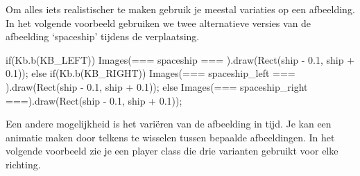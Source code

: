 Om alles iets realistischer te maken gebruik je meestal variaties op een afbeelding. In het volgende voorbeeld gebruiken we twee alternatieve versies van de afbeelding `spaceship' tijdens de verplaatsing.

\begin{code}
if(Kb.b(KB_LEFT))
{
	Images(=== spaceship ===      ).draw(Rect(ship - 0.1,  ship + 0.1));
} else if(Kb.b(KB_RIGHT))
{
	Images(=== spaceship_left === ).draw(Rect(ship - 0.1,  ship + 0.1));
} else
{
	Images(=== spaceship_right ===).draw(Rect(ship - 0.1,  ship + 0.1));
}
\end{code}

Een andere mogelijkheid is het vari\"eren van de afbeelding in tijd. Je kan een animatie maken door telkens te wisselen tussen bepaalde afbeeldingen. In het volgende voorbeeld zie je een player class die drie varianten gebruikt voor elke richting.

